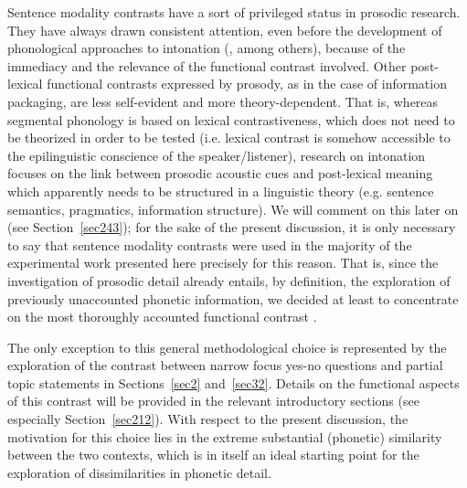Sentence modality contrasts have a sort of privileged status in prosodic research. They have always drawn consistent attention, even before the development of phonological approaches to intonation (\citealt{kretschmer1938ursprung}, among others), because of the immediacy and the relevance of the functional contrast involved. Other post-lexical functional contrasts expressed by prosody, as in the case of information packaging, are less self-evident and more theory-dependent. That is, whereas segmental phonology is based on lexical contrastiveness, which does not need to be theorized in order to be tested (i.e. lexical contrast is somehow accessible to the epilinguistic conscience of the speaker/listener), research on intonation focuses on the link between prosodic acoustic cues and post-lexical meaning which apparently needs to be structured in a linguistic theory (e.g. sentence semantics, pragmatics, information structure). We will comment on this later on (see Section~\ref{sec243}); for the sake of the present discussion, it is only necessary to say that sentence modality contrasts were used in the majority of the experimental work presented here precisely for this reason. That is, since the investigation of prosodic detail already entails, by definition, the exploration of previously unaccounted phonetic information, we decided at least to concentrate on the most thoroughly accounted functional contrast \citep{huddleston1994contrast,haan2002speaking}.

The only exception to this general methodological choice is represented by the exploration of the contrast between narrow focus yes-no questions and partial topic statements in Sections~\ref{sec2} and~\ref{sec32}. Details on the functional aspects of this contrast will be provided in the relevant introductory sections (see especially Section~\ref{sec212}). With respect to the present discussion, the motivation for this choice lies in the extreme substantial (phonetic) similarity between the two contexts, which is in itself an ideal starting point for the exploration of dissimilarities in phonetic detail.